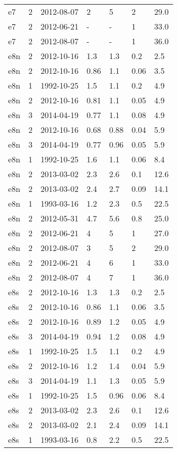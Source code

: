 \begin{table*}[htp]
\begin{tabular}{llll}
e7 & 2 & 2012-08-07 & 2 & 5 & 2 & 29.0 \\
e7 & 2 & 2012-06-21 & - & - & 1 & 33.0 \\
e7 & 2 & 2012-08-07 & - & - & 1 & 36.0 \\
e8n & 2 & 2012-10-16 & 1.3 & 1.3 & 0.2 & 2.5 \\
e8n & 2 & 2012-10-16 & 0.86 & 1.1 & 0.06 & 3.5 \\
e8n & 1 & 1992-10-25 & 1.5 & 1.1 & 0.2 & 4.9 \\
e8n & 2 & 2012-10-16 & 0.81 & 1.1 & 0.05 & 4.9 \\
e8n & 3 & 2014-04-19 & 0.77 & 1.1 & 0.08 & 4.9 \\
e8n & 2 & 2012-10-16 & 0.68 & 0.88 & 0.04 & 5.9 \\
e8n & 3 & 2014-04-19 & 0.77 & 0.96 & 0.05 & 5.9 \\
e8n & 1 & 1992-10-25 & 1.6 & 1.1 & 0.06 & 8.4 \\
e8n & 2 & 2013-03-02 & 2.3 & 2.6 & 0.1 & 12.6 \\
e8n & 2 & 2013-03-02 & 2.4 & 2.7 & 0.09 & 14.1 \\
e8n & 1 & 1993-03-16 & 1.2 & 2.3 & 0.5 & 22.5 \\
e8n & 2 & 2012-05-31 & 4.7 & 5.6 & 0.8 & 25.0 \\
e8n & 2 & 2012-06-21 & 4 & 5 & 1 & 27.0 \\
e8n & 2 & 2012-08-07 & 3 & 5 & 2 & 29.0 \\
e8n & 2 & 2012-06-21 & 4 & 6 & 1 & 33.0 \\
e8n & 2 & 2012-08-07 & 4 & 7 & 1 & 36.0 \\
e8s & 2 & 2012-10-16 & 1.3 & 1.3 & 0.2 & 2.5 \\
e8s & 2 & 2012-10-16 & 0.86 & 1.1 & 0.06 & 3.5 \\
e8s & 2 & 2012-10-16 & 0.89 & 1.2 & 0.05 & 4.9 \\
e8s & 3 & 2014-04-19 & 0.94 & 1.2 & 0.08 & 4.9 \\
e8s & 1 & 1992-10-25 & 1.5 & 1.1 & 0.2 & 4.9 \\
e8s & 2 & 2012-10-16 & 1.2 & 1.4 & 0.04 & 5.9 \\
e8s & 3 & 2014-04-19 & 1.1 & 1.3 & 0.05 & 5.9 \\
e8s & 1 & 1992-10-25 & 1.5 & 0.96 & 0.06 & 8.4 \\
e8s & 2 & 2013-03-02 & 2.3 & 2.6 & 0.1 & 12.6 \\
e8s & 2 & 2013-03-02 & 2.1 & 2.4 & 0.09 & 14.1 \\
e8s & 1 & 1993-03-16 & 0.8 & 2.2 & 0.5 & 22.5 \\

\end{tabular}
\end{table*}
